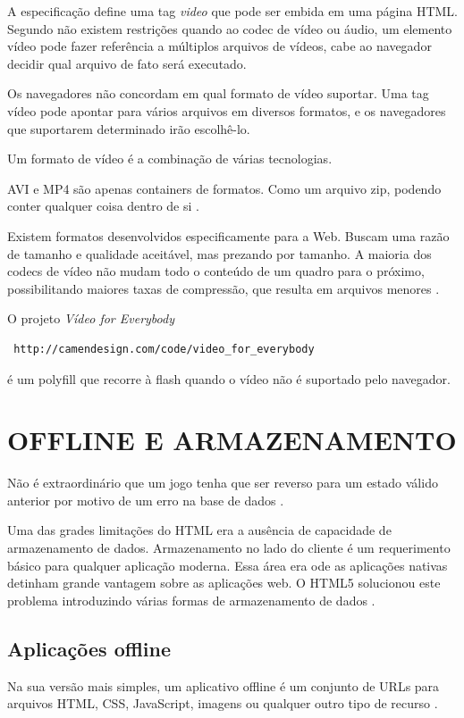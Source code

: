 \documentclass[
12pt,
a4paper,
portuges,
draft
]{report}
\begin{document}
A especificação define uma tag \textit{video} que pode ser embida em uma página HTML. Segundo \cite{diveIntohtml} não existem restrições quando ao codec de vídeo ou áudio, um elemento vídeo pode fazer referência a múltiplos arquivos de vídeos, cabe ao navegador decidir qual arquivo de fato será executado.

Os navegadores não concordam em qual formato de vídeo suportar.
Uma tag vídeo pode apontar para vários arquivos em diversos formatos, e os navegadores que suportarem determinado irão escolhê-lo.

Um formato de vídeo é a combinação de várias tecnologias.

AVI e MP4 são apenas containers de formatos. Como um arquivo zip, podendo conter qualquer coisa dentro de si \autocite{diveIntohtml}.

Existem formatos desenvolvidos especificamente para a Web. Buscam uma razão de tamanho e qualidade aceitável, mas prezando por tamanho. A maioria dos codecs de vídeo não mudam todo o conteúdo de um quadro para o próximo, possibilitando maiores taxas de compressão, que resulta em arquivos menores \autocite{diveIntohtml}.

O projeto \textit{Vídeo for Everybody} \begin{verbatim} http://camendesign.com/code/video_for_everybody \end{verbatim} é um polyfill que recorre à flash quando o vídeo não é suportado pelo navegador.


\section{OFFLINE E ARMAZENAMENTO}
Não é extraordinário que um jogo tenha que ser reverso para um estado
válido anterior por motivo de um erro na base de dados \autocite[pp. 5]{browserGamesTechnologyAndFuture}.

Uma das grades limitações do HTML era a ausência de capacidade
de armazenamento de dados. Armazenamento no lado do cliente é um
requerimento básico para qualquer aplicação moderna. Essa área
era ode as aplicações nativas detinham grande vantagem sobre as
aplicações web. O HTML5 solucionou este problema introduzindo várias
formas de armazenamento de dados \autocite{html5Tradeoffs}.

\subsection{Aplicações offline}
Na sua versão mais simples, um aplicativo offline é um conjunto de
URLs para arquivos HTML, CSS, JavaScript, imagens ou qualquer outro tipo
de recurso \autocite{diveIntohtml}.
\end{document}
